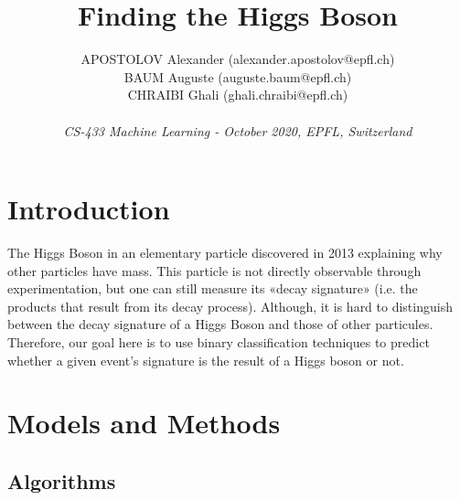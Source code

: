 \documentclass[10pt,conference,compsocconf]{IEEEtran}
\begin{document}
\title{{\large Finding the Higgs Boson}}

\author{
  APOSTOLOV Alexander (alexander.apostolov@epfl.ch)\\
  BAUM Auguste (auguste.baum@epfl.ch)\\
  CHRAIBI Ghali (ghali.chraibi@epfl.ch)\\
  \\
  \textit{CS-433 Machine Learning - October 2020, EPFL, Switzerland}
}
\maketitle

\begin{abstract}
\end{abstract}

\section{Introduction}

The Higgs Boson in an elementary particle discovered in 2013 explaining why other particles have mass. This particle is not directly observable through experimentation, but one can still measure its «decay signature» (i.e. the products that result from its decay process). Although, it is hard to distinguish between the decay signature of a Higgs Boson and those of other particules.\\
Therefore, our goal here is to use binary classification techniques to predict whether a given event’s signature is the result of a Higgs boson or not.


\section{Models and Methods}

\subsection{Algorithms}
\end{document}
